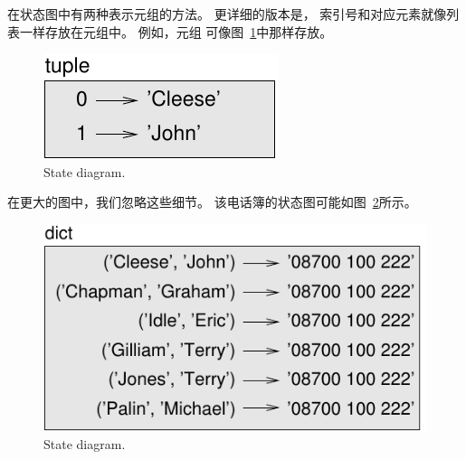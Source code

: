 {%

在状态图中有两种表示元组的方法。  
更详细的版本是， 索引号和对应元素就像列表一样存放在元组中。  
例如，元组 可像图~\ref{fig.tuple1}中那样存放。
 

\begin{figure}
\centerline
{\includegraphics[scale=0.8]{../source/figs/tuple1.pdf}}
\caption{State diagram.}
\label{fig.tuple1}
\end{figure}


在更大的图中，我们忽略这些细节。  
该电话簿的状态图可能如图~\ref{fig.dict2}所示。

\begin{figure}
\centerline
{\includegraphics[scale=0.8]{../source/figs/dict2.pdf}}
\caption{State diagram.}
\label{fig.dict2}
\end{figure}


}
